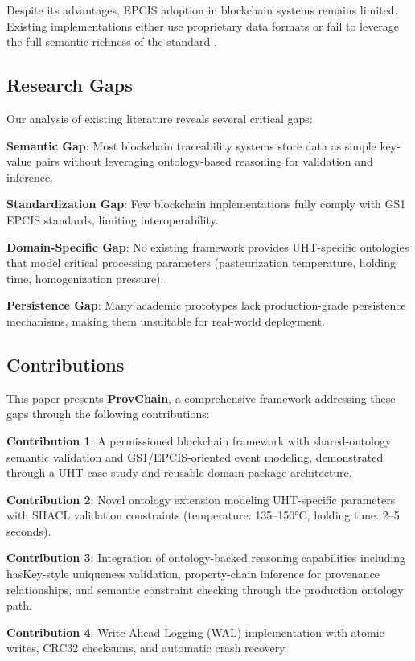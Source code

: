 \documentclass[preprint,review,12pt,authoryear]{elsarticle}
\begin{document}
Despite its advantages, EPCIS adoption in blockchain systems remains limited. Existing implementations either use proprietary data formats or fail to leverage the full semantic richness of the standard \cite{caro2018agri}.

\subsection{Research Gaps}

Our analysis of existing literature reveals several critical gaps:

\textbf{Semantic Gap}: Most blockchain traceability systems store data as simple key-value pairs without leveraging ontology-based reasoning for validation and inference.

\textbf{Standardization Gap}: Few blockchain implementations fully comply with GS1 EPCIS standards, limiting interoperability.

\textbf{Domain-Specific Gap}: No existing framework provides UHT-specific ontologies that model critical processing parameters (pasteurization temperature, holding time, homogenization pressure).

\textbf{Persistence Gap}: Many academic prototypes lack production-grade persistence mechanisms, making them unsuitable for real-world deployment.

\subsection{Contributions}

This paper presents \textbf{ProvChain}, a comprehensive framework addressing these gaps through the following contributions:

\textbf{Contribution 1}: A permissioned blockchain framework with shared-ontology semantic validation and GS1/EPCIS-oriented event modeling, demonstrated through a UHT case study and reusable domain-package architecture.

\textbf{Contribution 2}: Novel ontology extension modeling UHT-specific parameters with SHACL validation constraints (temperature: 135--150°C, holding time: 2--5 seconds).

\textbf{Contribution 3}: Integration of ontology-backed reasoning capabilities including hasKey-style uniqueness validation, property-chain inference for provenance relationships, and semantic constraint checking through the production ontology path.

\textbf{Contribution 4}: Write-Ahead Logging (WAL) implementation with atomic writes, CRC32 checksums, and automatic crash recovery.
\end{document}

